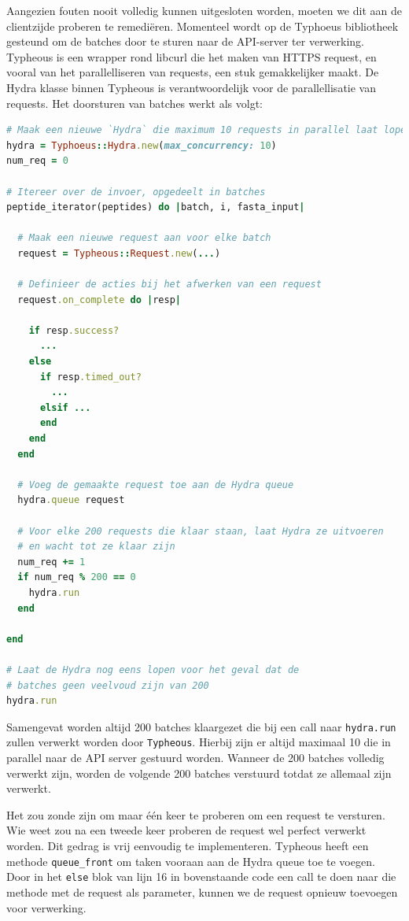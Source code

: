 Aangezien fouten nooit volledig kunnen uitgesloten worden, moeten we dit aan de 
clientzijde proberen te remediëren. Momenteel wordt op de Typhoeus 
bibliotheek gesteund om de batches door te sturen naar de API-server ter 
verwerking. Typheous is een wrapper rond libcurl die het maken van HTTPS 
request, en vooral van het parallelliseren van requests, een stuk gemakkelijker 
maakt\cite{typho7:online}. De Hydra klasse binnen Typheous is verantwoordelijk 
voor de parallellisatie van requests. Het doorsturen van batches werkt als 
volgt:

\begin{lstlisting}[caption={Ruby code verantwoordelijk voor het sturen van 
reqeusts naar de server en het verwerken van de resultaten}, 
label={lst:hydra}, language=Ruby]
# Maak een nieuwe `Hydra` die maximum 10 requests in parallel laat lopen
hydra = Typhoeus::Hydra.new(max_concurrency: 10)
num_req = 0
      
# Itereer over de invoer, opgedeelt in batches
peptide_iterator(peptides) do |batch, i, fasta_input|

  # Maak een nieuwe request aan voor elke batch
  request = Typheous::Request.new(...)
  
  # Definieer de acties bij het afwerken van een request
  request.on_complete do |resp|
    
    if resp.success?
      ...
    else
      if resp.timed_out?
        ...
      elsif ...
      end
    end
  end
  
  # Voeg de gemaakte request toe aan de Hydra queue
  hydra.queue request
  
  # Voor elke 200 requests die klaar staan, laat Hydra ze uitvoeren
  # en wacht tot ze klaar zijn
  num_req += 1
  if num_req % 200 == 0
    hydra.run
  end
  
end

# Laat de Hydra nog eens lopen voor het geval dat de
# batches geen veelvoud zijn van 200
hydra.run
\end{lstlisting}

Samengevat worden altijd 200 batches klaargezet die bij een call naar 
\texttt{hydra.run} zullen verwerkt worden door \texttt{Typheous}. Hierbij zijn 
er altijd maximaal 10 die in parallel naar de API server gestuurd worden. 
Wanneer de 200 batches volledig verwerkt zijn, worden de volgende 200 batches 
verstuurd totdat ze allemaal zijn verwerkt.

Het zou zonde zijn om maar één keer te proberen om een request te versturen. Wie
weet zou na een tweede keer proberen de request wel perfect verwerkt worden. Dit
gedrag is vrij eenvoudig te implementeren. Typheous heeft een methode 
\texttt{queue\_front}\cite{typhoqueuefront:online} om taken
vooraan aan de Hydra queue toe te voegen. Door in het \texttt{else}
blok van lijn 16 in bovenstaande code een call te doen naar die methode met de
request als parameter, kunnen we de request opnieuw toevoegen voor verwerking.

